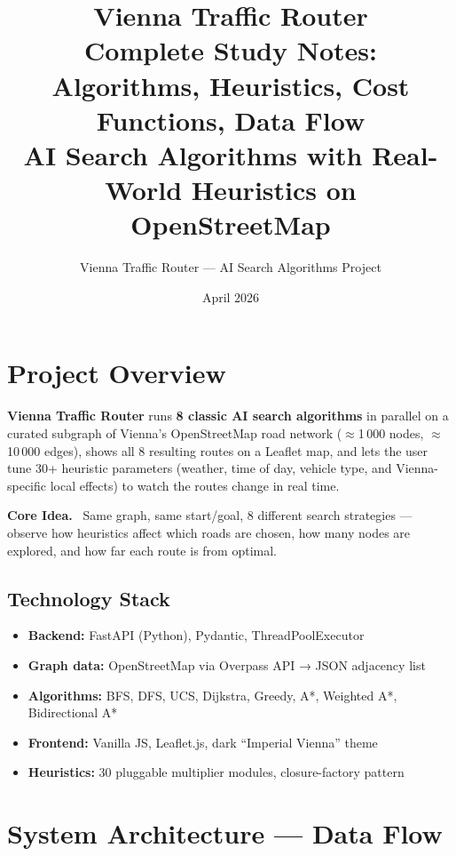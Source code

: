 \documentclass[11pt,a4paper]{article}
\title{%
  \textbf{\Large Vienna Traffic Router}\\[4pt]
  \large Complete Study Notes: Algorithms, Heuristics, Cost Functions, Data Flow\\[2pt]
  \normalsize AI Search Algorithms with Real-World Heuristics on OpenStreetMap
}
\author{Vienna Traffic Router — AI Search Algorithms Project}
\date{April 2026}
\newenvironment{warnbox}[1][Key Point]{%
  \begin{mdframed}[backgroundcolor=warnbox,linecolor=orange!60,linewidth=1pt]%
  \textbf{#1.}\ }{\end{mdframed}}
\begin{document}
\maketitle
\tableofcontents
\newpage

\section{Project Overview}

\textbf{Vienna Traffic Router} runs \textbf{8 classic AI search algorithms} in parallel on a curated
subgraph of Vienna's OpenStreetMap road network ($\approx$1\,000 nodes, $\approx$10\,000 edges), shows all 8
resulting routes on a Leaflet map, and lets the user tune 30+ heuristic parameters (weather, time of
day, vehicle type, and Vienna-specific local effects) to watch the routes change in real time.

\begin{warnbox}[Core Idea]
Same graph, same start/goal, 8 different search strategies — observe how heuristics affect which roads are chosen, how many nodes are explored, and how far each route is from optimal.
\end{warnbox}

\subsection{Technology Stack}
\begin{itemize}[noitemsep]
  \item \textbf{Backend:} FastAPI (Python), Pydantic, ThreadPoolExecutor
  \item \textbf{Graph data:} OpenStreetMap via Overpass API → JSON adjacency list
  \item \textbf{Algorithms:} BFS, DFS, UCS, Dijkstra, Greedy, A*, Weighted A*, Bidirectional A*
  \item \textbf{Frontend:} Vanilla JS, Leaflet.js, dark ``Imperial Vienna'' theme
  \item \textbf{Heuristics:} 30 pluggable multiplier modules, closure-factory pattern
\end{itemize}

\section{System Architecture — Data Flow}
\end{document}
